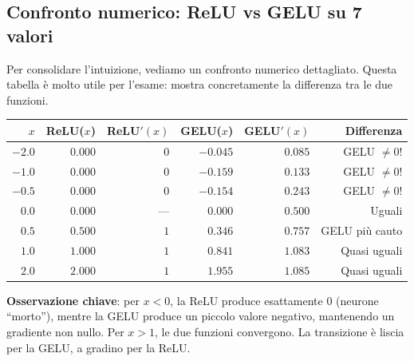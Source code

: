 \documentclass[12pt,a4paper]{article}
\begin{document}
\subsection{Confronto numerico: ReLU vs GELU su 7 valori} \label{sec:confronto_attivazioni}

Per consolidare l'intuizione, vediamo un confronto numerico dettagliato. Questa tabella \`e molto utile per l'esame: mostra concretamente la differenza tra le due funzioni.

\begin{examplebox}
\begin{center}
\begin{tabular}{@{}rrrrrr@{}}
\toprule
$x$ & ReLU($x$) & ReLU$'(x)$ & GELU($x$) & GELU$'(x)$ & Differenza \\
\midrule
$-2.0$ & $0.000$ & $0$ & $-0.045$ & $0.085$ & GELU $\neq 0$! \\
$-1.0$ & $0.000$ & $0$ & $-0.159$ & $0.133$ & GELU $\neq 0$! \\
$-0.5$ & $0.000$ & $0$ & $-0.154$ & $0.243$ & GELU $\neq 0$! \\
$0.0$ & $0.000$ & --- & $0.000$ & $0.500$ & Uguali \\
$0.5$ & $0.500$ & $1$ & $0.346$ & $0.757$ & GELU pi\`u cauto \\
$1.0$ & $1.000$ & $1$ & $0.841$ & $1.083$ & Quasi uguali \\
$2.0$ & $2.000$ & $1$ & $1.955$ & $1.085$ & Quasi uguali \\
\bottomrule
\end{tabular}
\end{center}

\textbf{Osservazione chiave}: per $x < 0$, la ReLU produce esattamente 0 (neurone ``morto''), mentre la GELU produce un piccolo valore negativo, mantenendo un gradiente non nullo. Per $x > 1$, le due funzioni convergono. La transizione \`e liscia per la GELU, a gradino per la ReLU.
\end{examplebox}
\end{document}
